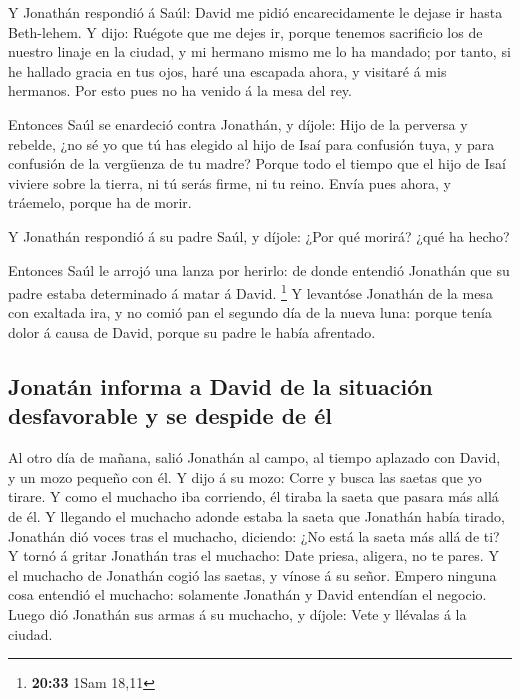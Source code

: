  Y Jonathán respondió á Saúl: David me pidió
encarecidamente le dejase ir hasta Beth-lehem.  Y dijo:
Ruégote que me dejes ir, porque tenemos sacrificio los de nuestro linaje
en la ciudad, y mi hermano mismo me lo ha mandado; por tanto, si he
hallado gracia en tus ojos, haré una escapada ahora, y visitaré á mis
hermanos. Por esto pues no ha venido á la mesa del rey.

 Entonces Saúl se enardeció contra Jonathán, y díjole:
Hijo de la perversa y rebelde, ¿no sé yo que tú has elegido al hijo de
Isaí para confusión tuya, y para confusión de la vergüenza de tu madre?
 Porque todo el tiempo que el hijo de Isaí viviere sobre
la tierra, ni tú serás firme, ni tu reino. Envía pues ahora, y tráemelo,
porque ha de morir.

 Y Jonathán respondió á su padre Saúl, y díjole: ¿Por qué
morirá? ¿qué ha hecho?

 Entonces Saúl le arrojó una lanza por herirlo: de donde
entendió Jonathán que su padre estaba determinado á matar á David.
\footnote{\textbf{20:33} 1Sam 18,11}  Y levantóse
Jonathán de la mesa con exaltada ira, y no comió pan el segundo día de
la nueva luna: porque tenía dolor á causa de David, porque su padre le
había afrentado.

\hypertarget{jonatuxe1n-informa-a-david-de-la-situaciuxf3n-desfavorable-y-se-despide-de-uxe9l}{%
\subsection{Jonatán informa a David de la situación desfavorable y se
despide de
él}\label{jonatuxe1n-informa-a-david-de-la-situaciuxf3n-desfavorable-y-se-despide-de-uxe9l}}

 Al otro día de mañana, salió Jonathán al campo, al
tiempo aplazado con David, y un mozo pequeño con él.  Y
dijo á su mozo: Corre y busca las saetas que yo tirare. Y como el
muchacho iba corriendo, él tiraba la saeta que pasara más allá de él.
 Y llegando el muchacho adonde estaba la saeta que
Jonathán había tirado, Jonathán dió voces tras el muchacho, diciendo:
¿No está la saeta más allá de ti?  Y tornó á gritar
Jonathán tras el muchacho: Date priesa, aligera, no te pares. Y el
muchacho de Jonathán cogió las saetas, y vínose á su señor.
 Empero ninguna cosa entendió el muchacho: solamente
Jonathán y David entendían el negocio.  Luego dió
Jonathán sus armas á su muchacho, y díjole: Vete y llévalas á la ciudad.


